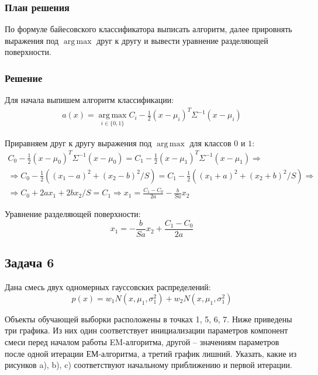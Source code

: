 \documentclass[12pt]{article}
\begin{document}
\subsubsection*{План решения}
По формуле байесовского классификатора выписать алгоритм, далее прировнять
выражения под $ \operatorname{arg\,max} $ друг к другу и вывести уравнение разделяющей поверхности.

\subsubsection*{Решение}
Для начала выпишем алгоритм классификации:
\begin{align*}
    a(x) = \operatorname*{arg\,max}_{i \in \{0, 1\}} C_i - \frac{1}{2} (x - \mu_i)^T\Sigma^{-1}(x - \mu_i)
\end{align*}

Приравняем друг к другу выражения под $ \operatorname{arg\,max} $ для классов $ 0 $ и $ 1 $:
\begin{align*}
    C_0 - \frac{1}{2} (x - \mu_0)^T\Sigma^{-1}(x - \mu_0) =
    C_1 - \frac{1}{2} (x - \mu_1)^T\Sigma^{-1}(x - \mu_1) \Rightarrow \\ \Rightarrow
    C_0 - \frac{1}{2} \left((x_1 - a)^2 + (x_2 - b)^2 / S \right) = C_1 - \frac{1}{2} \left((x_1 + a)^2 + (x_2 + b)^2 / S \right) \Rightarrow \\ \Rightarrow
    C_0 + 2 a x_1 + 2 b x_2 / S = C_1 \Rightarrow
    x_1 = \frac{C_1 - C_0}{2a} - \frac{b}{S a} x_2
\end{align*}

Уравнение разделяющей поверхности:
$$
    x_1 = -\frac{b}{S a} x_2 + \frac{C_1 - C_0}{2a}
$$

\subsection*{Задача 6}
Дана смесь двух одномерных гауссовских распределений:
$$
    p(x) = w_1 N(x,\mu_1, \sigma_1^2) + w_2 N(x,\mu_1, \sigma_1^2)
$$

Объекты обучающей выборки расположены в точках 1, 5, 6, 7. Ниже приведены
три графика. Из них один соответствует инициализации параметров компонент смеси
перед началом работы EM-алгоритма, другой -- значениям параметров после одной
итерации ЕМ-алгоритма, а третий график лишний. Указать, какие из рисунков a),
b), c) соответствуют начальному приближению и первой итерации.
\begin{center}
\end{center}
\end{document}
